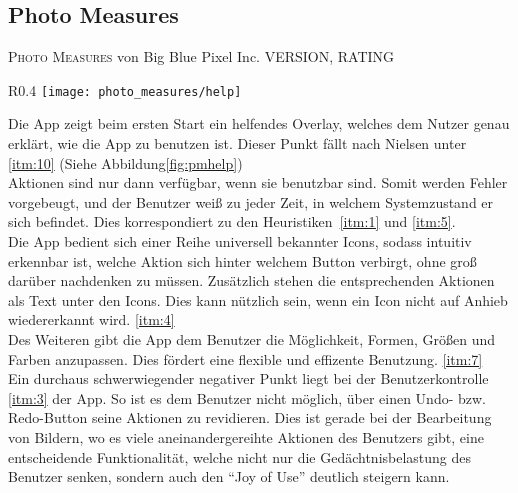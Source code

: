 \subsection{Photo Measures}

\textsc{Photo Measures} von Big Blue Pixel Inc. VERSION, RATING  \\

\begin{wrapfigure}{R}{0.4\textwidth}
	\centering
	\texttt{[image: photo\_measures/help]}
	\caption{Initialer Start}	
	\label{fig:pmhelp}
\end{wrapfigure}

Die App zeigt beim ersten Start ein helfendes Overlay, welches dem Nutzer genau erklärt, wie die App zu benutzen ist. Dieser Punkt fällt nach Nielsen unter \ref{itm:10} (Siehe Abbildung\ref{fig:pmhelp}) \\
 
Aktionen sind nur dann verfügbar, wenn sie benutzbar sind. Somit werden Fehler vorgebeugt, und der Benutzer weiß zu jeder Zeit, in welchem Systemzustand er sich befindet. Dies korrespondiert zu den Heuristiken~\ref{itm:1} und \ref{itm:5}.  \\

Die App bedient sich einer Reihe universell bekannter Icons, sodass intuitiv erkennbar ist, welche Aktion sich hinter welchem Button verbirgt, ohne groß darüber nachdenken zu müssen. Zusätzlich stehen die entsprechenden Aktionen als Text unter den Icons. Dies kann nützlich sein, wenn ein Icon nicht auf Anhieb wiedererkannt wird. \ref{itm:4}  \\

Des Weiteren gibt die App dem Benutzer die Möglichkeit, Formen, Größen und Farben anzupassen. Dies fördert eine flexible und effizente Benutzung. \ref{itm:7} \\

Ein durchaus schwerwiegender negativer Punkt liegt bei der Benutzerkontrolle \ref{itm:3} der App. So ist es dem Benutzer nicht möglich, über einen Undo- bzw. Redo-Button seine Aktionen zu revidieren. Dies ist gerade bei der Bearbeitung von Bildern, wo es viele aneinandergereihte Aktionen des Benutzers gibt, eine entscheidende Funktionalität, welche nicht nur die Gedächtnisbelastung des Benutzer senken, sondern auch den ``Joy of Use'' deutlich steigern kann. \\

